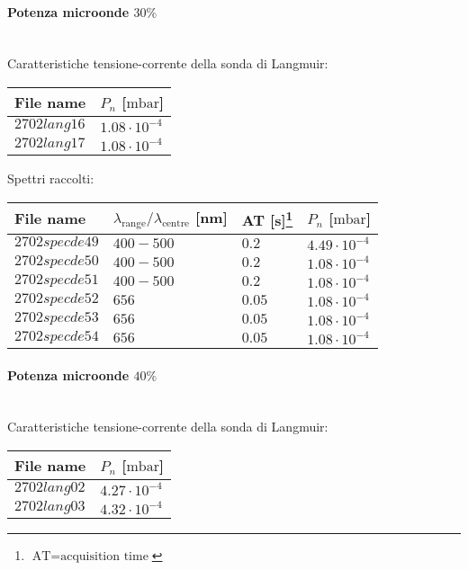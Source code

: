 \paragraph*{Potenza microonde $\text{30\%}$} ~\\
Caratteristiche tensione-corrente della sonda di Langmuir:
\begin{center}
  \begin{tabular}{p{3cm}p{3cm}}
  \toprule
File name	&$P_{n}$ [$\si{\milli\bar}$]\\
  \midrule
$2702lang16$	&$1.08\cdot10^{-4}$\\
$2702lang17$	&$1.08\cdot10^{-4}$\\

  \bottomrule
  \end{tabular}
\end{center}

Spettri raccolti:
\begin{center}
\begin{tabular}{p{3cm}p{4cm}p{2cm}p{3cm}}
\toprule
File name	&$\lambda_\text{range}\text{/}\lambda_\text{centre}$ [nm] &AT [s]\footnote{$\text{AT}=\text{acquisition time}$} &$P_{n}$ [$\si{\milli\bar}$]\\
\midrule
$2702specde49$	&$400-500$	&$0.2$		&$4.49\cdot10^{-4}$\\
$2702specde50$	&$400-500$	&$0.2$		&$1.08\cdot10^{-4}$\\
$2702specde51$	&$400-500$	&$0.2$		&$1.08\cdot10^{-4}$\\
$2702specde52$	&$656$		&$0.05$		&$1.08\cdot10^{-4}$\\
$2702specde53$	&$656$		&$0.05$		&$1.08\cdot10^{-4}$\\
$2702specde54$	&$656$		&$0.05$		&$1.08\cdot10^{-4}$\\

\bottomrule
\end{tabular}
\end{center}

\paragraph*{Potenza microonde $\text{40\%}$} ~\\
Caratteristiche tensione-corrente della sonda di Langmuir:
\begin{center}
\begin{tabular}{p{3cm}p{3cm}}
\toprule
File name	&$P_n$ [$\si{\milli\bar}$]\\
\midrule
$2702lang02$	&$4.27\cdot10^{-4}$\\
$2702lang03$	&$4.32\cdot10^{-4}$\\
\bottomrule
\end{tabular}
\end{center}

